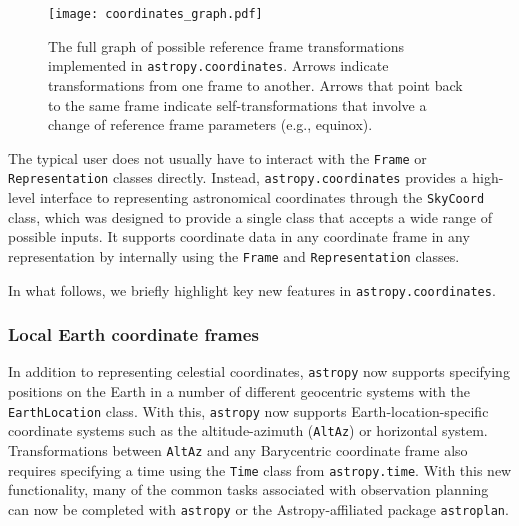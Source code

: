 \documentclass[modern]{aastex62}
\newcommand{\package}[1]{\texttt{#1}\xspace}
\newcommand{\astropy}{Astropy\xspace}
\newcommand{\astropypkg}{\package{astropy}}
\begin{document}
\begin{figure}
\texttt{[image: coordinates\_graph.pdf]}
\caption{%
    The full graph of possible reference frame transformations implemented in
    \texttt{astropy.coordinates}.
    Arrows indicate transformations from one frame to another.
    Arrows that point back to the same frame indicate self-transformations that
    involve a change of reference frame parameters (e.g., equinox).
    \label{fig:frame-transform-graph}
}
\end{figure}

The typical user does not usually have to interact with the \texttt{Frame} or
\texttt{Representation} classes directly.
Instead, \texttt{astropy.coordinates} provides a high-level interface to
representing astronomical coordinates through the \texttt{SkyCoord} class,
which was designed to provide a single class that
accepts a wide range of possible inputs.
It supports coordinate data in any coordinate frame in any representation by
internally using the \texttt{Frame} and \texttt{Representation} classes.

In what follows, we briefly highlight key new features in
\texttt{astropy.coordinates}.

\subsubsection{Local Earth coordinate frames}
In addition to representing celestial
    coordinates, \astropypkg now supports specifying positions on the Earth in
    a number of different geocentric systems with the \texttt{EarthLocation}
    class.
    With this, \astropypkg now supports Earth-location-specific coordinate
    systems such as the altitude-azimuth (\texttt{AltAz}) or horizontal system.
    Transformations between \texttt{AltAz} and any Barycentric coordinate frame
    also requires specifying a time using the \texttt{Time} class from
    \texttt{astropy.time}.
    With this new functionality, many of the common tasks associated with
    observation planning can now be completed with \astropypkg or the
    \astropy-affiliated package \package{astroplan}\citep{astroplan_AAS}.
\end{document}
